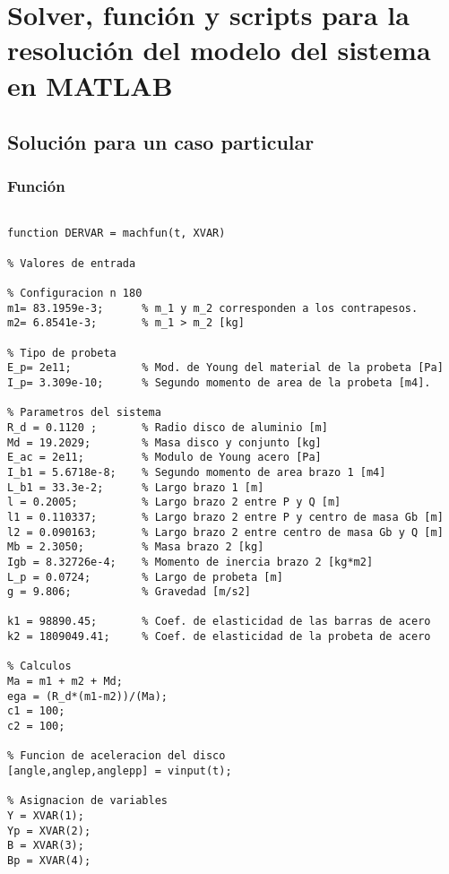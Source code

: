 %
\chapter{Solver, función y scripts para la resolución del modelo del sistema en MATLAB}
\label{ch:anexo_c}

\section{Solución para un caso particular}
\label{sec:sol_part}

\subsection{Función}
\label{sec:fun_part}

\begin{lstlisting}

function DERVAR = machfun(t, XVAR)

% Valores de entrada

% Configuracion n 180
m1= 83.1959e-3;      % m_1 y m_2 corresponden a los contrapesos.
m2= 6.8541e-3;       % m_1 > m_2 [kg]

% Tipo de probeta
E_p= 2e11;           % Mod. de Young del material de la probeta [Pa]
I_p= 3.309e-10;      % Segundo momento de area de la probeta [m4].

% Parametros del sistema
R_d = 0.1120 ;       % Radio disco de aluminio [m]
Md = 19.2029;        % Masa disco y conjunto [kg]
E_ac = 2e11;         % Modulo de Young acero [Pa]
I_b1 = 5.6718e-8;    % Segundo momento de area brazo 1 [m4]
L_b1 = 33.3e-2;      % Largo brazo 1 [m]
l = 0.2005;          % Largo brazo 2 entre P y Q [m]
l1 = 0.110337;       % Largo brazo 2 entre P y centro de masa Gb [m]
l2 = 0.090163;       % Largo brazo 2 entre centro de masa Gb y Q [m]
Mb = 2.3050;         % Masa brazo 2 [kg]
Igb = 8.32726e-4;    % Momento de inercia brazo 2 [kg*m2]
L_p = 0.0724;        % Largo de probeta [m]
g = 9.806;           % Gravedad [m/s2]

k1 = 98890.45;       % Coef. de elasticidad de las barras de acero
k2 = 1809049.41;     % Coef. de elasticidad de la probeta de acero

% Calculos
Ma = m1 + m2 + Md;
ega = (R_d*(m1-m2))/(Ma);
c1 = 100;
c2 = 100;

% Funcion de aceleracion del disco
[angle,anglep,anglepp] = vinput(t);

% Asignacion de variables
Y = XVAR(1);
Yp = XVAR(2);
B = XVAR(3);
Bp = XVAR(4);


\end{lstlisting}
